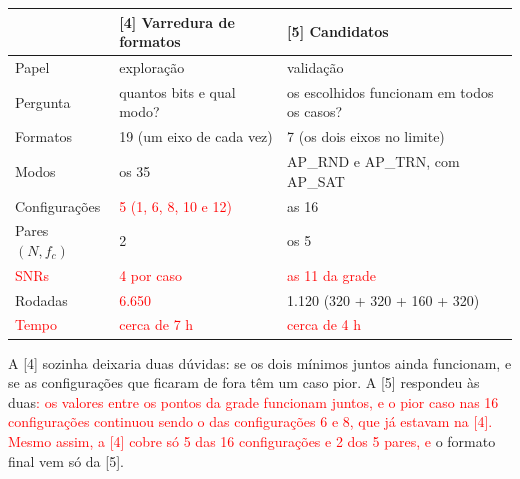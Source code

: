 \documentclass[11pt]{article}
\newcommand{\novo}[1]{\textcolor{red}{#1}}
\begin{document}
\begin{center}
\small
\renewcommand{\arraystretch}{1.15}
\begin{tabular}{|l|l|l|}
\hline
 & [4] Varredura de formatos & [5] Candidatos \\
\hline
Papel & exploração & validação \\
Pergunta & quantos bits e qual modo? & os escolhidos funcionam em todos os casos? \\
Formatos & 19 (um eixo de cada vez) & 7 (os dois eixos no limite) \\
Modos & os 35 & AP\_RND e AP\_TRN, com AP\_SAT \\
Configurações & \novo{5 (1, 6, 8, 10 e 12)} & as 16 \\
Pares $(N, f_c)$ & 2 & os 5 \\
\novo{SNRs} & \novo{4 por caso} & \novo{as 11 da grade} \\
Rodadas & \novo{6.650} & 1.120 (320 + 320 + 160 + 320) \\
\novo{Tempo} & \novo{cerca de 7 h} & \novo{cerca de 4 h} \\
\hline
\end{tabular}
\end{center}
A [4] sozinha deixaria duas dúvidas: se os dois mínimos juntos ainda funcionam, e se as
configurações que ficaram de fora têm um caso pior. A [5] respondeu às duas\novo{: os valores
entre os pontos da grade funcionam juntos, e o pior caso nas 16 configurações continuou sendo o
das configurações 6 e 8, que já estavam na [4]. Mesmo assim, a [4] cobre só 5 das 16
configurações e 2 dos 5 pares, e} o formato final vem só da [5].
\end{document}

